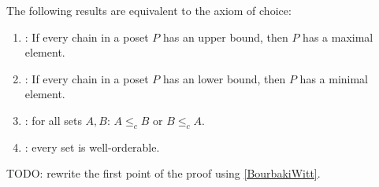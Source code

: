 \begin{theorem} \label{choiceEquivalents}
The following results are equivalent to the axiom of choice:
\begin{enumerate}
\item {}: If every chain in a poset $P$ has an upper bound, then $P$ has a maximal element.
\item {}: If every chain in a poset $P$ has an lower bound, then $P$ has a minimal element.
\item {}: for all sets $A,B$: $A\leq_c B$ or $B\leq_c A$.
\item {}: every set is well-orderable.
\end{enumerate}
\end{theorem}
TODO: rewrite the first point of the proof using \ref{BourbakiWitt}.
